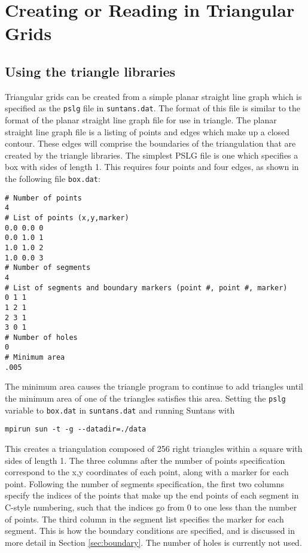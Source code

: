 \documentclass[12pt,oneside]{article}
\begin{document}
\section{Creating or Reading in Triangular Grids} \label{sec:grids}

\subsection{Using the triangle libraries} \label{sec:tri}

Triangular grids can be created from a simple planar straight line
graph which is specified as the \verb+pslg+ file in \verb+suntans.dat+.
The format of this file is similar to the format of the planar straight
line graph file for use in triangle.  The planar straight line graph
file is a listing of points and edges which make up a closed contour.
These edges will comprise the boundaries of the triangulation that are
created by the triangle libraries.  The simplest PSLG file is one which
specifies a box with sides of length 1.  This requires four points and
four edges, as shown in the following file \verb+box.dat+:
\begin{verbatim}
# Number of points
4
# List of points (x,y,marker)
0.0 0.0 0
0.0 1.0 1
1.0 1.0 2
1.0 0.0 3
# Number of segments
4
# List of segments and boundary markers (point #, point #, marker)
0 1 1
1 2 1
2 3 1
3 0 1
# Number of holes
0
# Minimum area
.005
\end{verbatim}
The minimum area causes the triangle program to continue to add triangles
until the minimum area of one of the triangles satisfies this area.  
Setting the \verb+pslg+ variable to \verb+box.dat+ in \verb+suntans.dat+
and running Suntans with
\begin{verbatim}
mpirun sun -t -g --datadir=./data
\end{verbatim}
This creates a triangulation composed of 256 right triangles within a square
with sides of length 1.  The three columns after the number of points
specification correspond to the x,y coordinates of each point, along
with a marker for each point.  Following the number of segments specification,
the first two columns specify the indices of the points that make up
the end points of each segment in C-style numbering, such that the indices
go from 0 to one less than the number of points.  The third column in the
segment list specifies the marker for each segment.  This is how the boundary
conditions are specified, and is discussed in more detail in Section \ref{sec:boundary}.
The number of holes is currently not used.
\end{document}
